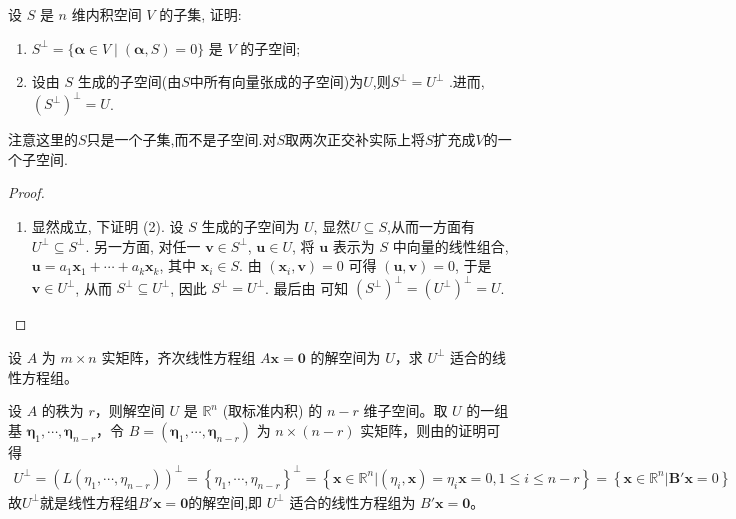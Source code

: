 \documentclass[../../main.tex]{subfiles}
\begin{document}
\begin{proposition}\label{proposition:例9.19}
设 $S$ 是 $n$ 维内积空间 $V$ 的子集, 证明:
\begin{enumerate}[(1)]
\item $S^\perp = \{ \boldsymbol{\alpha} \in V \mid (\boldsymbol{\alpha}, S) = 0\}$ 是 $V$ 的子空间;
\item 设由 $S$ 生成的子空间(由$S$中所有向量张成的子空间)为$U$,则$S^\perp=U^\perp$ .进而,$(S^\perp)^\perp=U$.
\end{enumerate}
\end{proposition}
\begin{remark}
注意这里的$S$只是一个子集,而不是子空间.对$S$取两次正交补实际上将$S$扩充成$V$的一个子空间.
\end{remark}
\begin{proof}
\begin{enumerate}[(1)]
\item 显然成立, 下证明 (2). 设 $S$ 生成的子空间为 $U$, 显然$U\subseteq S$,从而一方面有 $U^\perp \subseteq S^\perp$. 另一方面, 对任一 $\boldsymbol{v} \in S^\perp$, $\boldsymbol{u} \in U$, 将 $\boldsymbol{u}$ 表示为 $S$ 中向量的线性组合, $\boldsymbol{u} = a_1\boldsymbol{x}_1 + \cdots + a_k\boldsymbol{x}_k$, 其中 $\boldsymbol{x}_i \in S$. 由 $(\boldsymbol{x}_i, \boldsymbol{v}) = 0$ 可得 $(\boldsymbol{u}, \boldsymbol{v}) = 0$, 于是 $\boldsymbol{v} \in U^\perp$, 从而 $S^\perp \subseteq U^\perp$, 因此 $S^\perp = U^\perp$. 最后由 可知 $(S^\perp)^\perp = (U^\perp)^\perp = U$. 
\end{enumerate} 

\end{proof}

\begin{proposition}\label{proposition:例9.20}
设 $A$ 为 $m \times n$ 实矩阵，齐次线性方程组 $A\boldsymbol{x} = \boldsymbol{0}$ 的解空间为 $U$，求 $U^{\perp}$ 适合的线性方程组。
\end{proposition}
\begin{solution}
设 $A$ 的秩为 $r$，则解空间 $U$ 是 $\mathbb{R}^n$ (取标准内积) 的 $n - r$ 维子空间。取 $U$ 的一组基 $\boldsymbol{\eta}_1, \cdots, \boldsymbol{\eta}_{n - r}$，令 $B = (\boldsymbol{\eta}_1, \cdots, \boldsymbol{\eta}_{n - r})$ 为 $n \times (n - r)$ 实矩阵，则由的证明可得
\begin{align*}
U^{\bot}=\left( L\left( \eta _1,\cdots ,\eta _{n-r} \right) \right) ^{\bot}=\left\{ \eta _1,\cdots ,\eta _{n-r} \right\} ^{\bot}=\left\{ \boldsymbol{x}\in \mathbb{R} ^n|\left( \eta _i,\boldsymbol{x} \right) =\eta _i\boldsymbol{x}=0,1\le i\le n-r \right\} =\left\{ \boldsymbol{x}\in \mathbb{R} ^n|\boldsymbol{B}' \boldsymbol{x}=0 \right\} 
\end{align*}
故$U^{\perp}$就是线性方程组$B'\boldsymbol{x} = \boldsymbol{0}$的解空间,即 $U^{\perp}$ 适合的线性方程组为 $B'\boldsymbol{x} = \boldsymbol{0}$。

\end{solution}
\end{document}
